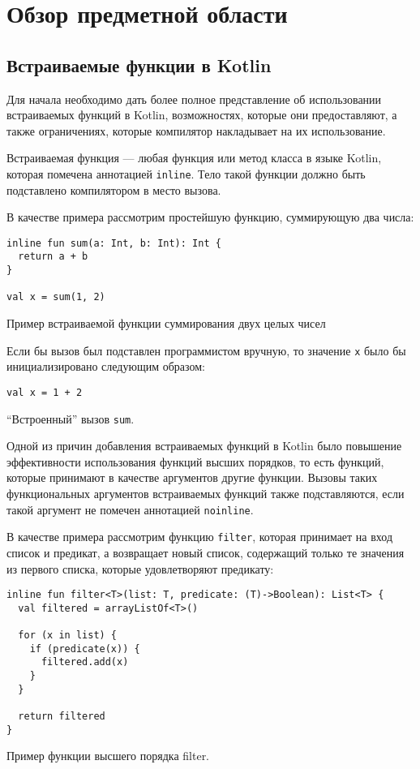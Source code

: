 \section{Обзор предметной области}

\subsection{Встраиваемые функции в Kotlin}

Для начала необходимо дать более полное представление
об использовании встраиваемых функций в Kotlin,
возможностях, которые они предоставляют, а также
ограничениях, которые компилятор накладывает на их использование.

Встраиваемая функция --- любая функция или метод класса в языке Kotlin,
которая помечена аннотацией \texttt{inline}.
Тело такой функции должно быть подставлено компилятором в место вызова.

В качестве примера рассмотрим простейшую функцию, суммирующую два числа:
\begin{listing}[H]
\begin{verbatim}
inline fun sum(a: Int, b: Int): Int {
  return a + b
}

val x = sum(1, 2)
\end{verbatim}
\caption{Пример встраиваемой функции суммирования двух целых чисел}
\end{listing}

Если бы вызов был подставлен программистом вручную, то
значение \texttt{x} было бы инициализировано следующим образом:
\begin{listing}[H]
\begin{verbatim}
val x = 1 + 2
\end{verbatim}
\caption{``Встроенный'' вызов \texttt{sum}.}
\end{listing}

Одной из причин добавления встраиваемых функций в Kotlin было
повышение эффективности использования функций высших порядков,
то есть функций, которые принимают в качестве аргументов
другие функции. Вызовы таких функциональных аргументов
встраиваемых функций также подставляются, если такой
аргумент не помечен аннотацией \texttt{noinline}.

В качестве примера рассмотрим функцию \texttt{filter},
которая принимает на вход список и предикат, а возвращает
новый список, содержащий только те значения из
первого списка, которые удовлетворяют предикату:
\begin{listing}[H]
\begin{verbatim}
inline fun filter<T>(list: T, predicate: (T)->Boolean): List<T> {
  val filtered = arrayListOf<T>()

  for (x in list) {
    if (predicate(x)) {
      filtered.add(x)
    }
  }

  return filtered
}
\end{verbatim}
\caption{Пример функции высшего порядка filter.}
\label{lst:filter-example}
\end{listing}


